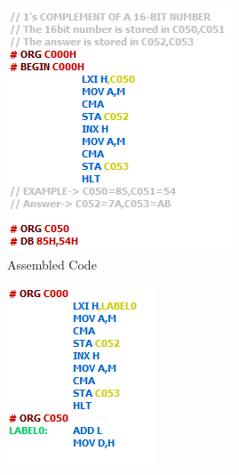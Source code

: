 \begin{figure}[htbp]
        \centering
        \begin{subfigure}[b]{0.4\textwidth}
                \includegraphics[width=\textwidth]{sampleCode1}
                \caption{Assembled Code}
                \label{fig:s1asm}
        \end{subfigure}
       \begin{subfigure}[b]{0.3\textwidth}
                       \includegraphics[width=\textwidth]{sampleCode1Rev}

\end{subfigure}
\end{figure}
